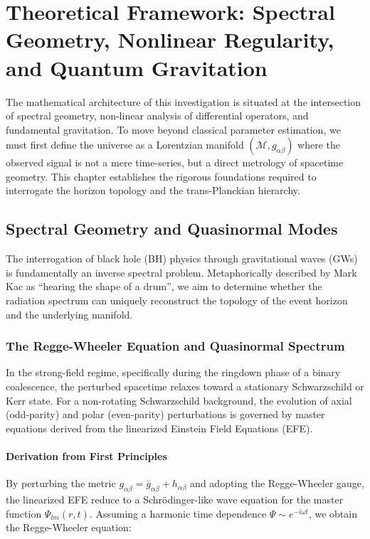 \documentclass[11pt,a4paper,spanish]{book}
\numberwithin{equation}{chapter}
\numberwithin{figure}{chapter}
\numberwithin{equation}{chapter}
\numberwithin{figure}{chapter}
\numberwithin{table}{chapter}
\begin{document}
\chapter{Theoretical Framework: Spectral Geometry, Nonlinear Regularity, and Quantum Gravitation}
\label{chap:theoretical-framework}

The mathematical architecture of this investigation is situated at the intersection of spectral geometry, non-linear analysis of differential operators, and fundamental gravitation. To move beyond classical parameter estimation, we must first define the universe as a Lorentzian manifold $(\mathcal{M}, g_{\alpha\beta})$ where the observed signal is not a mere time-series, but a direct metrology of spacetime geometry. This chapter establishes the rigorous foundations required to interrogate the horizon topology and the trans-Planckian hierarchy.

\section{Spectral Geometry and Quasinormal Modes}

The interrogation of black hole (BH) physics through gravitational waves (GWs) is fundamentally an inverse spectral problem. Metaphorically described by Mark Kac as ``hearing the shape of a drum'', we aim to determine whether the radiation spectrum can uniquely reconstruct the topology of the event horizon and the underlying manifold.

\subsection{The Regge-Wheeler Equation and Quasinormal Spectrum}

In the strong-field regime, specifically during the ringdown phase of a binary coalescence, the perturbed spacetime relaxes toward a stationary Schwarzschild or Kerr state. For a non-rotating Schwarzschild background, the evolution of axial (odd-parity) and polar (even-parity) perturbations is governed by master equations derived from the linearized Einstein Field Equations (EFE).

\subsubsection{Derivation from First Principles}

By perturbing the metric $g_{\alpha\beta} = \bar{g}_{\alpha\beta} + h_{\alpha\beta}$ and adopting the Regge-Wheeler gauge, the linearized EFE reduce to a Schrödinger-like wave equation for the master function $\Psi_{lm}(r,t)$. Assuming a harmonic time dependence $\Psi \sim e^{-i\omega t}$, we obtain the Regge-Wheeler equation:
\end{document}
